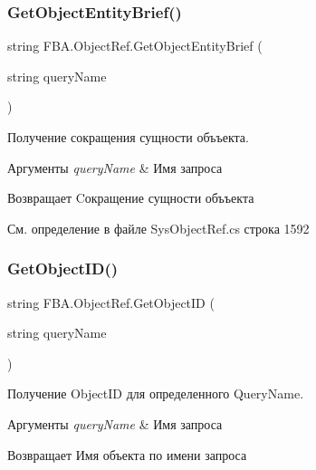 \subsubsection{\texorpdfstring{Get\+Object\+Entity\+Brief()}{GetObjectEntityBrief()}}
{\footnotesize\ttfamily string F\+B\+A.\+Object\+Ref.\+Get\+Object\+Entity\+Brief (\begin{DoxyParamCaption}\item[{string}]{query\+Name }\end{DoxyParamCaption})}



Получение сокращения сущности объъекта. 


\begin{DoxyParams}{Аргументы}
{\em query\+Name} & Имя запроса\\
\hline
\end{DoxyParams}
\begin{DoxyReturn}{Возвращает}
Cокращение сущности объъекта
\end{DoxyReturn}


См. определение в файле Sys\+Object\+Ref.\+cs строка 1592

\mbox{\label{class_f_b_a_1_1_object_ref_aa362a5126d87e79b5009257e6bd0bce2}} 
\subsubsection{\texorpdfstring{Get\+Object\+I\+D()}{GetObjectID()}}
{\footnotesize\ttfamily string F\+B\+A.\+Object\+Ref.\+Get\+Object\+ID (\begin{DoxyParamCaption}\item[{string}]{query\+Name }\end{DoxyParamCaption})}



Получение Object\+ID для определенного Query\+Name. 


\begin{DoxyParams}{Аргументы}
{\em query\+Name} & Имя запроса\\
\hline
\end{DoxyParams}
\begin{DoxyReturn}{Возвращает}
Имя объекта по имени запроса
\end{DoxyReturn}


